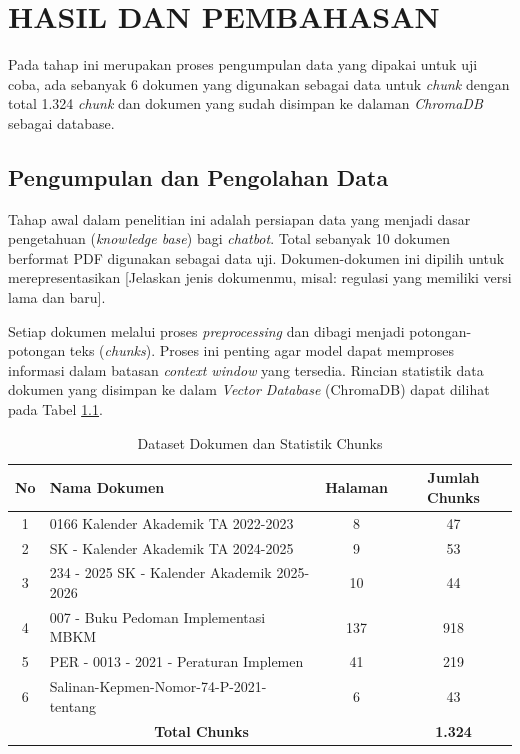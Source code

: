 \chapter{HASIL DAN PEMBAHASAN}
\label{BAB4:hasil}

Pada tahap ini merupakan proses pengumpulan data yang dipakai untuk uji coba, ada sebanyak 6 dokumen
yang digunakan sebagai data untuk \textit{chunk} dengan total 1.324 \textit{chunk} dan dokumen yang sudah
 disimpan ke dalaman \textit{ChromaDB} sebagai database. 

\section{Pengumpulan dan Pengolahan Data}
\label{sec:pengolahan_data}

Tahap awal dalam penelitian ini adalah persiapan data yang menjadi dasar pengetahuan (\textit{knowledge base}) bagi \textit{chatbot}. Total sebanyak 10 dokumen berformat PDF digunakan sebagai data uji. Dokumen-dokumen ini dipilih untuk merepresentasikan [Jelaskan jenis dokumenmu, misal: regulasi yang memiliki versi lama dan baru].

Setiap dokumen melalui proses \textit{preprocessing} dan dibagi menjadi potongan-potongan teks (\textit{chunks}). Proses ini penting agar model dapat memproses informasi dalam batasan \textit{context window} yang tersedia. Rincian statistik data dokumen yang disimpan ke dalam \textit{Vector Database} (ChromaDB) dapat dilihat pada Tabel \ref{tab:dataset_dokumen}.

\begin{table}[h!]
    \centering
    \caption{Dataset Dokumen dan Statistik Chunks}
    \label{tab:dataset_dokumen}
    \begin{tabular}{|c|l|c|c|}
        \hline
        \textbf{No} & \textbf{Nama Dokumen} & \textbf{Halaman} & \textbf{Jumlah Chunks} \\ \hline
        1 & 0166 Kalender Akademik TA 2022-2023 & 8 & 47 \\ \hline
        2 & SK - Kalender Akademik TA 2024-2025 & 9 & 53 \\ \hline
        3 & 234 - 2025 SK - Kalender Akademik 2025-2026 & 10 & 44 \\ \hline
        4 & 007 - Buku Pedoman Implementasi MBKM & 137 & 918 \\ \hline
        5 & PER - 0013 - 2021 - Peraturan Implemen & 41 & 219 \\ \hline
        6 & Salinan-Kepmen-Nomor-74-P-2021-tentang & 6 & 43 \\ \hline
        \multicolumn{3}{|c|}{\textbf{Total Chunks}} & \textbf{1.324} \\ \hline
    \end{tabular}
\end{table}

